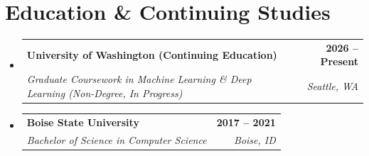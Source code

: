 \documentclass[letterpaper,11pt]{article}
\makeatletter
\newcommand{\resumeSubheading}[4]{
  \vspace{-2pt}\item
    \begin{tabular*}{1.0\textwidth}[t]{l@{\extracolsep{\fill}}r}
      \textbf{#1} & \textbf{\small #2} \\
      \textit{\small#3} & \textit{\small #4} \\
    \end{tabular*}\vspace{-7pt}
}
\newcommand{\resumeSubHeadingListStart}{\begin{itemize}[leftmargin=0.0in, label={}]}
\newcommand{\resumeSubHeadingListEnd}{\end{itemize}}
\makeatother
\begin{document}
\section{Education \& Continuing Studies}
  \resumeSubHeadingListStart
    \resumeSubheading
      {University of Washington (Continuing Education)}{2026 -- Present}
      {Graduate Coursework in Machine Learning \& Deep Learning (Non-Degree, In Progress)}{Seattle, WA}
    \resumeSubheading
      {Boise State University}{2017 -- 2021}
      {Bachelor of Science in Computer Science}{Boise, ID}
  \resumeSubHeadingListEnd
\end{document}
